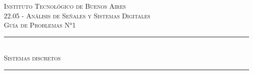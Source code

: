 \begin{titlepage}
    
    \newcommand{\HRule}{\rule{\linewidth}{0.5mm}} %
        
    \center %
         
        
    \textsc{\LARGE Instituto Tecnológico de Buenos Aires}\\[2cm] %
    \textsc{\Large 22.05 - Análisis de Señales y Sistemas Digitales}\\[1.5cm] %
    \textsc{\large Gu\'ia de Problemas N°1}\\[0.5cm] %
        
        
        
    \HRule \\[0.5cm]
    \textsc{ \huge  Sistemas  discretos}\\[0.4cm] %
    \HRule \\[2cm]
         
        

\end{titlepage}
